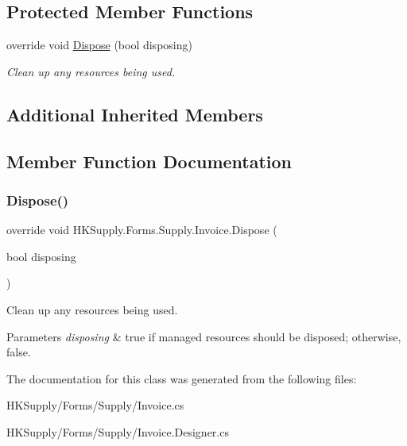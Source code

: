 \subsection*{Protected Member Functions}
\begin{DoxyCompactItemize}
\item 
override void \mbox{\hyperlink{class_h_k_supply_1_1_forms_1_1_supply_1_1_invoice_ad2cc44687b4f9a51d32a8d8a8544e283}{Dispose}} (bool disposing)
\begin{DoxyCompactList}\small\item\em Clean up any resources being used. \end{DoxyCompactList}\end{DoxyCompactItemize}
\subsection*{Additional Inherited Members}


\subsection{Member Function Documentation}
\mbox{\label{class_h_k_supply_1_1_forms_1_1_supply_1_1_invoice_ad2cc44687b4f9a51d32a8d8a8544e283}} 
\subsubsection{\texorpdfstring{Dispose()}{Dispose()}}
{\footnotesize\ttfamily override void H\+K\+Supply.\+Forms.\+Supply.\+Invoice.\+Dispose (\begin{DoxyParamCaption}\item[{bool}]{disposing }\end{DoxyParamCaption})\hspace{0.3cm}{\ttfamily [protected]}}



Clean up any resources being used. 


\begin{DoxyParams}{Parameters}
{\em disposing} & true if managed resources should be disposed; otherwise, false.\\
\hline
\end{DoxyParams}


The documentation for this class was generated from the following files\+:\begin{DoxyCompactItemize}
\item 
H\+K\+Supply/\+Forms/\+Supply/Invoice.\+cs\item 
H\+K\+Supply/\+Forms/\+Supply/Invoice.\+Designer.\+cs\end{DoxyCompactItemize}
